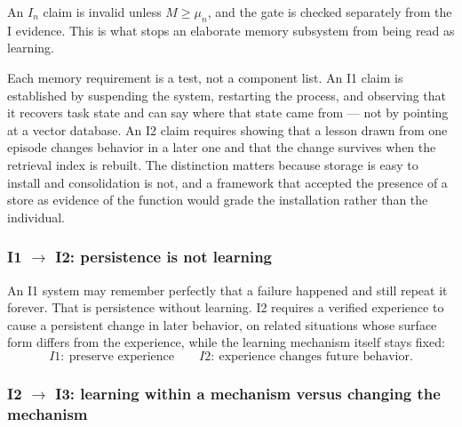 \documentclass[11pt]{article}
\theoremstyle{definition}
\begin{document}
An $I_n$ claim is invalid unless $M \ge \mu_n$, and the gate is checked separately from the I evidence. This is what stops an elaborate memory subsystem from being read as learning.

Each memory requirement is a test, not a component list. An I1 claim is established by suspending the system, restarting the process, and observing that it recovers task state and can say where that state came from --- not by pointing at a vector database. An I2 claim requires showing that a lesson drawn from one episode changes behavior in a later one and that the change survives when the retrieval index is rebuilt. The distinction matters because storage is easy to install and consolidation is not, and a framework that accepted the presence of a store as evidence of the function would grade the installation rather than the individual.

\subsubsection{I1 $\to$ I2: persistence is not learning}

An I1 system may remember perfectly that a failure happened and still repeat it forever. That is persistence without learning. I2 requires a verified experience to cause a persistent change in later behavior, on related situations whose surface form differs from the experience, while the learning mechanism itself stays fixed:
\begin{equation}
I1:\ \text{preserve experience} \qquad I2:\ \text{experience changes future behavior}.
\end{equation}

\subsubsection{I2 $\to$ I3: learning within a mechanism versus changing the mechanism}\label{sec:theta}
\end{document}
